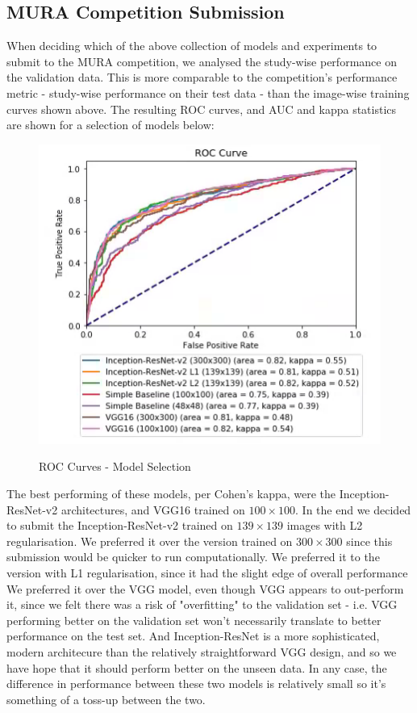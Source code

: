 \documentclass[11pt]{article} %
\theoremstyle{plain}
\theoremstyle{definition}
\begin{document}
\subsection{MURA Competition Submission}
When deciding which of the above collection of models and experiments to submit to the MURA competition, we analysed the study-wise performance on the validation data. This is more comparable to the competition's performance metric - study-wise performance on their test data - than the image-wise training curves shown above. The resulting ROC curves, and AUC and kappa statistics are shown for a selection of models below:
\begin{figure}[!ht]
\centering
\includegraphics[scale=0.8]{roc_curves_final.png}
\label{fig:roc_curves_final}
\caption{ROC Curves - Model Selection}
\end{figure}
\FloatBarrier
\noindent
The best performing of these models, per Cohen's kappa, were the Inception-ResNet-v2 architectures, and VGG16 trained on \(100 \times 100\). In the end we decided to submit the Inception-ResNet-v2 trained on \(139 \times 139\) images with L2 regularisation. We preferred it over the version trained on \(300 \times 300\) since this submission would be quicker to run computationally. We preferred it to the version with L1 regularisation, since it had the slight edge of overall performance We preferred it over the VGG model, even though VGG appears to out-perform it, since we felt there was a risk of "overfitting" to the validation set - i.e. VGG performing better on the validation set won't necessarily translate to better performance on the test set. And Inception-ResNet is a more sophisticated, modern architecure than the relatively straightforward VGG design, and so we have hope that it should perform better on the unseen data. In any case, the difference in performance between these two models is relatively small so it's something of a toss-up between the two.
\end{document}
